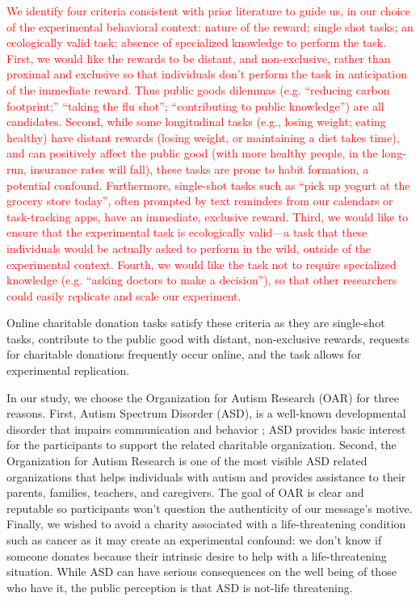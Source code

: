 \textcolor{red}{We identify four criteria consistent with prior literature \cite{lee2013does, sussman2015framing,saunders2016no,rumsey2003influence} to guide us, in our choice of the experimental behavioral context: nature of the reward; single shot tasks; an ecologically valid task; absence of specialized knowledge to perform the task. First, we would like the rewards to be distant, and non-exclusive, rather than proximal and exclusive so that individuals don't perform the task in anticipation of the immediate reward. Thus public goods dilemmas (e.g. ``reducing carbon footprint;'' ``taking the flu shot''; ``contributing to public knowledge'') are all candidates. Second, while some longitudinal tasks (e.g., losing weight; eating healthy) have distant rewards (losing weight, or maintaining a diet takes time), and can positively affect the public good (with more healthy people, in the long-run, insurance rates will fall), these tasks are prone to habit formation, a potential confound. Furthermore, single-shot tasks such as ``pick up yogurt at the grocery store today'', often prompted by text reminders from our calendars or task-tracking apps, have an immediate, exclusive reward. Third, we would like to ensure that the experimental task is ecologically valid---a task that these individuals would be actually asked to perform in the wild, outside of the experimental context. Fourth, we would like the task not to require specialized knowledge (e.g. ``asking doctors to make a decision''), so that other researchers could easily replicate and scale our experiment. }


Online charitable donation tasks satisfy these criteria as they are single-shot tasks, contribute to the public good with distant, non-exclusive rewards, requests for charitable donations frequently occur online, and the task allows for experimental replication. 


In our study, we choose the Organization for Autism Research (OAR) for three reasons. First, Autism Spectrum Disorder (ASD), is a well-known developmental disorder that impairs communication and behavior \cite{american2013diagnostic}; ASD provides basic interest for the participants to support the related charitable organization. Second, the Organization for Autism Research is one of the most visible ASD related organizations that helps individuals with autism and provides assistance to their parents, families, teachers, and caregivers. The goal of OAR is clear and reputable so participants won't question the authenticity of our message's motive. Finally, we wished to avoid a charity associated with a life-threatening condition such as cancer as it may create an experimental confound: we don't know if someone donates because their intrinsic desire to help with a life-threatening situation. While ASD can have serious consequences on the well being of those who have it, the public perception is that ASD is not-life threatening. 

